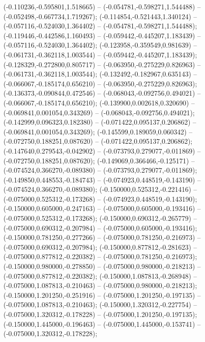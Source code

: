  (-0.110236,-0.595801,1.518665) -- (-0.054781,-0.598271,1.544488) -- (-0.052498,-0.667734,1.719267);
 (-0.114854,-0.521443,1.340124) -- (-0.057116,-0.524030,1.364402) -- (-0.054781,-0.598271,1.544488);
 (-0.119446,-0.442586,1.160493) -- (-0.059442,-0.445207,1.183439) -- (-0.057116,-0.524030,1.364402);
 (-0.123958,-0.359549,0.981639) -- (-0.061731,-0.362118,1.003544) -- (-0.059442,-0.445207,1.183439);
 (-0.128329,-0.272800,0.805717) -- (-0.063950,-0.275229,0.826963) -- (-0.061731,-0.362118,1.003544);
 (-0.132492,-0.182967,0.635143) -- (-0.066067,-0.185174,0.656210) -- (-0.063950,-0.275229,0.826963);
 (-0.136373,-0.090844,0.472546) -- (-0.068043,-0.092756,0.494021) -- (-0.066067,-0.185174,0.656210);
 (-0.139900,0.002618,0.320690) -- (-0.069841,0.001054,0.343269) -- (-0.068043,-0.092756,0.494021);
 (-0.142999,0.096323,0.182380) -- (-0.071422,0.095137,0.206862) -- (-0.069841,0.001054,0.343269);
 (-0.145599,0.189059,0.060342) -- (-0.072750,0.188251,0.087620) -- (-0.071422,0.095137,0.206862);
 (-0.147640,0.279543,-0.042902) -- (-0.073793,0.279077,-0.011869) -- (-0.072750,0.188251,0.087620);
 (-0.149069,0.366466,-0.125171) -- (-0.074524,0.366270,-0.089380) -- (-0.073793,0.279077,-0.011869);
 (-0.149850,0.448553,-0.184743) -- (-0.074923,0.448519,-0.143190) -- (-0.074524,0.366270,-0.089380);
 (-0.150000,0.525312,-0.221416) -- (-0.075000,0.525312,-0.173268) -- (-0.074923,0.448519,-0.143190);
 (-0.150000,0.605000,-0.247163) -- (-0.075000,0.605000,-0.193416) -- (-0.075000,0.525312,-0.173268);
 (-0.150000,0.690312,-0.265779) -- (-0.075000,0.690312,-0.207984) -- (-0.075000,0.605000,-0.193416);
 (-0.150000,0.781250,-0.277266) -- (-0.075000,0.781250,-0.216973) -- (-0.075000,0.690312,-0.207984);
 (-0.150000,0.877812,-0.281623) -- (-0.075000,0.877812,-0.220382) -- (-0.075000,0.781250,-0.216973);
 (-0.150000,0.980000,-0.278850) -- (-0.075000,0.980000,-0.218213) -- (-0.075000,0.877812,-0.220382);
 (-0.150000,1.087813,-0.268948) -- (-0.075000,1.087813,-0.210463) -- (-0.075000,0.980000,-0.218213);
 (-0.150000,1.201250,-0.251916) -- (-0.075000,1.201250,-0.197135) -- (-0.075000,1.087813,-0.210463);
 (-0.150000,1.320312,-0.227754) -- (-0.075000,1.320312,-0.178228) -- (-0.075000,1.201250,-0.197135);
 (-0.150000,1.445000,-0.196463) -- (-0.075000,1.445000,-0.153741) -- (-0.075000,1.320312,-0.178228);
